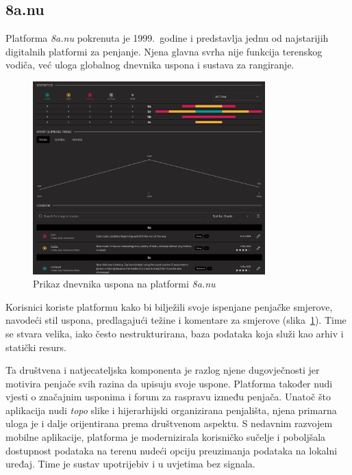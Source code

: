 \subsection{8a.nu}

Platforma \textit{8a.nu} pokrenuta je 1999.\ godine i predstavlja jednu od najstarijih digitalnih platformi za penjanje. Njena glavna svrha nije funkcija terenskog vodiča, već uloga globalnog dnevnika uspona i sustava za rangiranje. 

\begin{figure}[H]
    \centering
    \includegraphics[width=0.8\textwidth]{images/analiza/8anu_logbook.png}
    \caption{Prikaz dnevnika uspona na platformi \textit{8a.nu}}
    \label{fig:8anu_logbook}
\end{figure}

Korisnici koriste platformu kako bi bilježili svoje ispenjane penjačke smjerove, navodeći stil uspona, predlagajući težine i komentare za smjerove (slika~\ref{fig:8anu_logbook}). Time se stvara velika, iako često nestrukturirana, baza podataka koja služi kao arhiv i statički resurs.



Ta društvena i natjecateljska komponenta je razlog njene dugovječnosti jer motivira penjače svih razina da upisuju svoje uspone. Platforma također nudi vjesti o značajnim usponima i forum za raspravu između penjača. Unatoč što aplikacija nudi \textit{topo} slike i hijerarhijski organizirana penjališta, njena primarna uloga je i dalje orijentirana prema društvenom aspektu. 
S nedavnim razvojem mobilne aplikacije, platforma je modernizirala korisničko sučelje i poboljšala dostupnost podataka na terenu nudeći opciju preuzimanja podataka na lokalni uređaj. Time je sustav upotrijebiv i u uvjetima bez signala.


